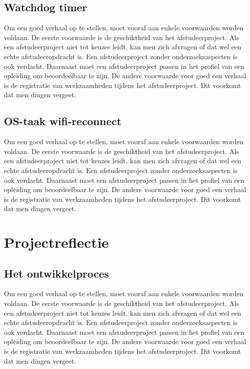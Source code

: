 		\section{Watchdog timer}
		Om een goed verhaal op te stellen, moet vooraf aan enkele voorwaarden
		worden voldaan. De eerste voorwaarde is de geschiktheid van het
		afstudeerproject. Als een afstudeerproject niet tot keuzes leidt, kan
		men zich afvragen of dat wel een echte afstudeeropdracht is. Een
		afstudeerproject zonder onderzoeksaspecten is ook verdacht. Daarnaast
		moet een afstudeerproject passen in het profiel van een opleiding om
		beoordeelbaar te zijn. De andere voorwaarde voor goed een verhaal is
		de registratie van werkzaamheden tijdens het afstudeerproject. Dit
		voorkomt dat men dingen vergeet.
		
		\section{OS-taak wifi-reconnect }
		Om een goed verhaal op te stellen, moet vooraf aan enkele voorwaarden
		worden voldaan. De eerste voorwaarde is de geschiktheid van het
		afstudeerproject. Als een afstudeerproject niet tot keuzes leidt, kan
		men zich afvragen of dat wel een echte afstudeeropdracht is. Een
		afstudeerproject zonder onderzoeksaspecten is ook verdacht. Daarnaast
		moet een afstudeerproject passen in het profiel van een opleiding om
		beoordeelbaar te zijn. De andere voorwaarde voor goed een verhaal is
		de registratie van werkzaamheden tijdens het afstudeerproject. Dit
		voorkomt dat men dingen vergeet.
		\chapter{Projectreflectie}
		
	 
		\section{Het ontwikkelproces}
		Om een goed verhaal op te stellen, moet vooraf aan enkele voorwaarden
		worden voldaan. De eerste voorwaarde is de geschiktheid van het
		afstudeerproject. Als een afstudeerproject niet tot keuzes leidt, kan
		men zich afvragen of dat wel een echte afstudeeropdracht is. Een
		afstudeerproject zonder onderzoeksaspecten is ook verdacht. Daarnaast
		moet een afstudeerproject passen in het profiel van een opleiding om
		beoordeelbaar te zijn. De andere voorwaarde voor goed een verhaal is
		de registratie van werkzaamheden tijdens het afstudeerproject. Dit
		voorkomt dat men dingen vergeet.
		
